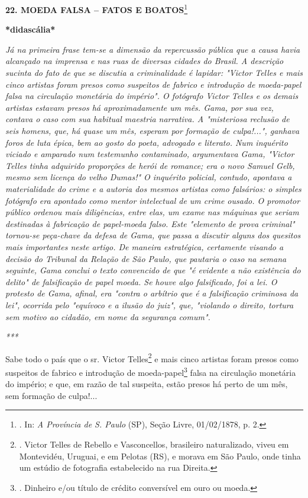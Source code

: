 \textbf{22. MOEDA FALSA -- FATOS E BOATOS}\footnote{. In: \emph{A
  Província de S. Paulo} (SP), Seção Livre, 01/02/1878, p. 2.}

\textbf{*didascália*}

\emph{Já na primeira frase tem-se a dimensão da repercussão pública que
a causa havia alcançado na imprensa e nas ruas de diversas cidades do
Brasil. A descrição sucinta do fato de que se discutia a criminalidade é
lapidar: "Victor Telles e mais cinco artistas foram presos como
suspeitos de fabrico e introdução de moeda-papel falsa na circulação
monetária do império". O fotógrafo Victor Telles e os demais artistas
estavam presos há aproximadamente um mês. Gama, por sua vez, contava o
caso com sua habitual maestria narrativa. A "misteriosa reclusão de seis
homens, que, há quase um mês, esperam por formação de culpa!...",
ganhava foros de luta épica, bem ao gosto do poeta, advogado e literato.
Num inquérito viciado e amparado num testemunho contaminado, argumentava
Gama, "Victor Telles tinha adquirido proporções de herói de romance; era
o novo Samuel Gelb, mesmo sem licença do velho Dumas!" O inquérito
policial, contudo, apontava a materialidade do crime e a autoria dos
mesmos artistas como falsários: o simples fotógrafo era apontado como
mentor intelectual de um crime ousado. O promotor público ordenou mais
diligências, entre elas, um exame nas máquinas que seriam destinadas à
fabricação de papel-moeda falso. Este "elemento de prova criminal"
tornou-se peça-chave da defesa de Gama, que passa a discutir alguns dos
quesitos mais importantes neste artigo. De maneira estratégica,
certamente visando a decisão do Tribunal da Relação de São Paulo, que
pautaria o caso na semana seguinte, Gama conclui o texto convencido de
que "é evidente a não existência do delito" de falsificação de papel
moeda. Se houve algo falsificado, foi a lei. O protesto de Gama, afinal,
era "contra o arbítrio que é a falsificação criminosa da lei", ocorrida
pelo "equívoco e a ilusão do juiz", que, "violando o direito, tortura
sem motivo ao cidadão, em nome da segurança comum". }

\emph{***}

Sabe todo o país que o sr. Victor Telles\footnote{. Victor Telles de
  Rebello e Vasconcellos, brasileiro naturalizado, viveu em Montevidéu,
  Uruguai, e em Pelotas (RS), e morava em São Paulo, onde tinha um
  estúdio de fotografia estabelecido na rua Direita.} e mais cinco
artistas foram presos como suspeitos de fabrico e introdução de
moeda-papel\footnote{. Dinheiro e/ou título de crédito conversível em
  ouro ou moeda.} falsa na circulação monetária do império; e que, em
razão de tal suspeita, estão presos há perto de um mês, sem formação de
culpa!...

